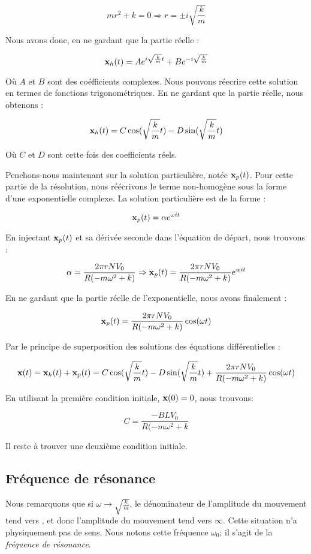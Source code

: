 $$mr^2 + k = 0 \Rightarrow r = \pm i\sqrt{\frac{k}{m}}$$

Nous avons donc, en ne gardant que la partie réelle :

$${\bf x}_h(t) = Ae^{i\sqrt{\frac{k}{m}}t} + Be^{-i\sqrt{\frac{k}{m}}}$$

Où $A$ et $B$ sont des coéfficients complexes. Nous pouvons réecrire cette solution
en termes de fonctions trigonométriques. En ne gardant que la partie réelle, 
nous obtenons :

$${\bf x}_h(t) = C\cos(\sqrt{\frac{k}{m}}t) - D\sin(\sqrt{\frac{k}{m}}t)$$

Où $C$ et $D$ sont cette fois des coefficients réels.

Penchons-nous maintenant sur la solution particulière, notée ${\bf x}_p(t)$. Pour
cette partie de la résolution, nous réécrivons le terme non-homogène sous la forme d'une
exponentielle complexe. La solution particulière est de la forme :

$${\bf x}_p(t) = \alpha e^{\omega it}$$

En injectant ${\bf x}_p(t)$ et sa dérivée seconde dans l'équation de départ, nous trouvons :

$$\alpha = \frac{2\pi rNV_0}{R(-m\omega^2 + k)} \Rightarrow {\bf x}_p(t) = \frac{2\pi rNV_0}{R(-m\omega^2 + k)}e^{wit}$$

En ne gardant que la partie réelle de l'exponentielle, nous avons finalement :

$${\bf x}_p(t) = \frac{2\pi rNV_0}{R(-m\omega^2 + k)} \cos (\omega t)$$

Par le principe de superposition des solutions des équations différentielles :

$${\bf x}(t) = {\bf x}_h(t) + {\bf x}_p(t) = C\cos(\sqrt{\frac{k}{m}}t) - D\sin(\sqrt{\frac{k}{m}}t) + \frac{2\pi rNV_0}{R(-m\omega^2 + k)} \cos (\omega t)$$

En utilisant la première condition initiale, ${\bf x}(0) = 0$, nous trouvons:

$$C = \frac{-BLV_0}{R(-m\omega^2+k}$$

Il reste à trouver une deuxième condition initiale.

\subsection{Fréquence de résonance}
Nous remarquons que si $\omega \rightarrow \sqrt{\frac{k}{m}}$, le dénominateur de l'amplitude du mouvement
tend vers , et donc l'amplitude du mouvement tend vers $\infty$. Cette situation n'a physiquement
pas de sens. Nous notons cette fréquence $\omega_0$; il s'agit de la \textit{fréquence de résonance}.

